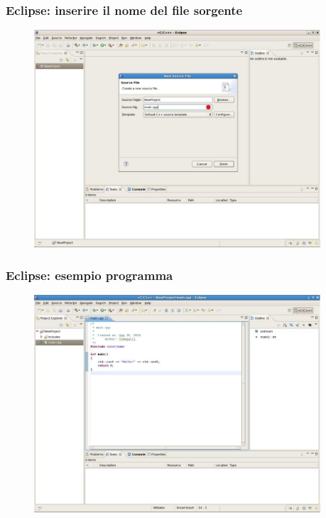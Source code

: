 \documentclass{beamer}
\begin{document}

\begin{frame}[fragile]

    \frametitle{Eclipse: inserire il nome del file sorgente}

    \begin{figure}
        \centering
        \includegraphics[width=0.95\textwidth]{./images/eclipse4}
    \end{figure}

\end{frame}


\begin{frame}[fragile]

    \frametitle{Eclipse: esempio programma}

    \begin{figure}
        \centering
        \includegraphics[width=0.95\textwidth]{./images/eclipse5}
    \end{figure}

\end{frame}
\end{document}

